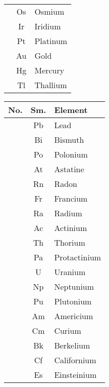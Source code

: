 \documentclass{article}
\begin{document}
\begin{table}[h!]
\begin{minipage}{0.33\textwidth}
\begin{tabular}{>{\Rownum}ccl}
			             & Os           & Osmium           \\
			             & Ir           & Iridium          \\
			             & Pt           & Platinum         \\
			             & Au           & Gold             \\
			             & Hg           & Mercury          \\
			             & Tl           & Thallium         \\
			\bottomrule
		\end{tabular}
	\end{minipage}%
	\hfill
	\begin{minipage}{0.33\textwidth}
		\centering
		\begin{tabular}{>{\Rownum}ccl}
			\toprule
			\textbf{No.} & \textbf{Sm.} & \textbf{Element} \\
			\midrule
			             & Pb           & Lead             \\
			             & Bi           & Bismuth          \\
			             & Po           & Polonium         \\
			             & At           & Astatine         \\
			             & Rn           & Radon            \\
			             & Fr           & Francium         \\
			             & Ra           & Radium           \\
			             & Ac           & Actinium         \\
			             & Th           & Thorium          \\
			             & Pa           & Protactinium     \\
			             & U            & Uranium          \\
			             & Np           & Neptunium        \\
			             & Pu           & Plutonium        \\
			             & Am           & Americium        \\
			             & Cm           & Curium           \\
			             & Bk           & Berkelium        \\
			             & Cf           & Californium      \\
			             & Es           & Einsteinium      \\

\end{tabular}
\end{minipage}
\end{table}
\end{document}
